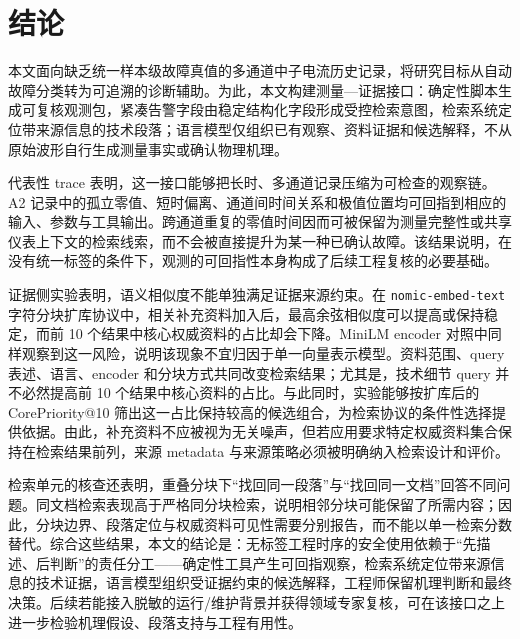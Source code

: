 \section{结论}

本文面向缺乏统一样本级故障真值的多通道中子电流历史记录，将研究目标从自动故障分类转为可追溯的诊断辅助。为此，本文构建测量—证据接口：确定性脚本生成可复核观测包，紧凑告警字段由稳定结构化字段形成受控检索意图，检索系统定位带来源信息的技术段落；语言模型仅组织已有观察、资料证据和候选解释，不从原始波形自行生成测量事实或确认物理机理。

代表性 trace 表明，这一接口能够把长时、多通道记录压缩为可检查的观察链。A2 记录中的孤立零值、短时偏离、通道间时间关系和极值位置均可回指到相应的输入、参数与工具输出。跨通道重复的零值时间因而可被保留为测量完整性或共享仪表上下文的检索线索，而不会被直接提升为某一种已确认故障。该结果说明，在没有统一标签的条件下，观测的可回指性本身构成了后续工程复核的必要基础。

证据侧实验表明，语义相似度不能单独满足证据来源约束。在 \texttt{nomic-embed-text} 字符分块扩库协议中，相关补充资料加入后，最高余弦相似度可以提高或保持稳定，而前 10 个结果中核心权威资料的占比却会下降。MiniLM encoder 对照中同样观察到这一风险，说明该现象不宜归因于单一向量表示模型。资料范围、query 表述、语言、encoder 和分块方式共同改变检索结果；尤其是，技术细节 query 并不必然提高前 10 个结果中核心资料的占比。与此同时，实验能够按扩库后的 CorePriority@10 筛出这一占比保持较高的候选组合，为检索协议的条件性选择提供依据。由此，补充资料不应被视为无关噪声，但若应用要求特定权威资料集合保持在检索结果前列，来源 metadata 与来源策略必须被明确纳入检索设计和评价。

检索单元的核查还表明，重叠分块下“找回同一段落”与“找回同一文档”回答不同问题。同文档检索表现高于严格同分块检索，说明相邻分块可能保留了所需内容；因此，分块边界、段落定位与权威资料可见性需要分别报告，而不能以单一检索分数替代。综合这些结果，本文的结论是：无标签工程时序的安全使用依赖于“先描述、后判断”的责任分工——确定性工具产生可回指观察，检索系统定位带来源信息的技术证据，语言模型组织受证据约束的候选解释，工程师保留机理判断和最终决策。后续若能接入脱敏的运行/维护背景并获得领域专家复核，可在该接口之上进一步检验机理假设、段落支持与工程有用性。
